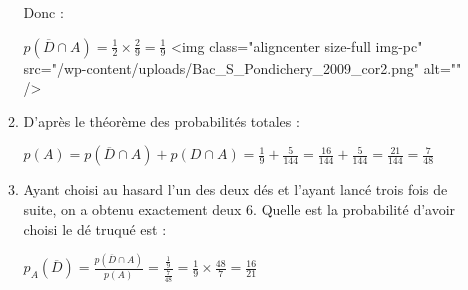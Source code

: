 \begin{corrige}
\begin{enumerate}
\begin{enumerate}
               \par
               Donc :
               \par
               $p\left(\overline{D} \cap A\right)=\frac{1}{2}\times \frac{2}{9}=\frac{1}{9}$
               <img class="aligncenter size-full img-pc" src="/wp-content/uploads/Bac_S_Pondichery_2009_cor2.png" alt="" />
\begin{center}
 \begin{extern}%
   \end{extern}
\end{center}
\item
               D'après le théorème des probabilités totales :
               \par
               $p\left(A\right)=p\left(\overline{D} \cap A\right)+p\left(D \cap A\right)=\frac{1}{9}+\frac{5}{144}=\frac{16}{144}+\frac{5}{144}=\frac{21}{144}=\frac{7}{48}$
               \item
               Ayant choisi au hasard l'un des deux dés et l'ayant lancé trois fois de suite, on a obtenu exactement deux 6. Quelle est la probabilité d'avoir choisi le dé truqué est :
               \par
               $p_{A}\left(\overline{D}\right)=\frac{p\left(\overline{D} \cap A\right)}{p\left(A\right)}=\frac{\frac{1}{9}}{\frac{7}{48}}=\frac{1}{9}\times \frac{48}{7}=\frac{16}{21}$

\end{enumerate}
\end{enumerate}
\end{corrige}
